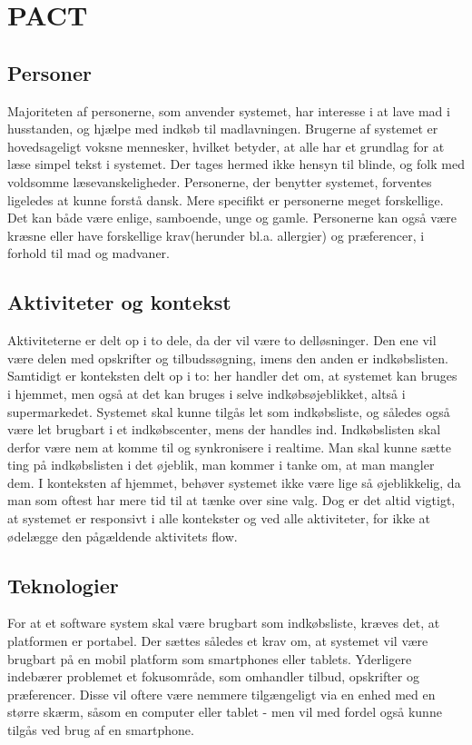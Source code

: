 \section{PACT}

\subsection{Personer}
Majoriteten af personerne, som anvender systemet, har interesse i at lave mad i husstanden, og hjælpe med indkøb til madlavningen.
Brugerne af systemet er hovedsageligt voksne mennesker, hvilket betyder, at alle har et grundlag for at læse simpel tekst i systemet.
Der tages hermed ikke hensyn til blinde, og folk med voldsomme læsevanskeligheder.
Personerne, der benytter systemet, forventes ligeledes at kunne forstå dansk.
Mere specifikt er personerne meget forskellige.
Det kan både være enlige, samboende, unge og gamle.
Personerne kan også være kræsne eller have forskellige krav(herunder bl.a. allergier) og præferencer, i forhold til mad og madvaner.

\subsection{Aktiviteter og kontekst}
Aktiviteterne er delt op i to dele, da der vil være to delløsninger.
Den ene vil være delen med opskrifter og tilbudssøgning, imens den anden er indkøbslisten.
Samtidigt er konteksten delt op i to: her handler det om, at systemet kan bruges i hjemmet, men også at det kan bruges i selve indkøbsøjeblikket, altså i supermarkedet.
Systemet skal kunne tilgås let som indkøbsliste, og således også være let brugbart i et indkøbscenter, mens der handles ind.
Indkøbslisten skal derfor være nem at komme til og synkronisere i realtime.
Man skal kunne sætte ting på indkøbslisten i det øjeblik, man kommer i tanke om, at man mangler dem.
I konteksten af hjemmet, behøver systemet ikke være lige så øjeblikkelig, da man som oftest har mere tid til at tænke over sine valg.
Dog er det altid vigtigt, at systemet er responsivt i alle kontekster og ved alle aktiviteter, for ikke at ødelægge den pågældende aktivitets flow.

\subsection{Teknologier}
For at et software system skal være brugbart som indkøbsliste, kræves det, at platformen er portabel.
Der sættes således et krav om, at systemet vil være brugbart på en mobil platform som smartphones eller tablets.
Yderligere indebærer problemet et fokusområde, som omhandler tilbud, opskrifter og præferencer.
Disse vil oftere være nemmere tilgængeligt via en enhed med en større skærm, såsom en computer eller tablet - men vil med fordel også kunne tilgås ved brug af en smartphone.
